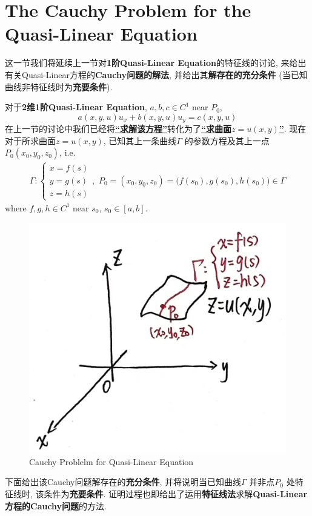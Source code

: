 \newpage

\section{The Cauchy Problem for the Quasi-Linear Equation}
	这一节我们将延续上一节对\textbf{1阶Quasi-Linear Equation}的特征线的讨论, 来给出有关Quasi-Linear方程的\textbf{Cauchy问题的解法}, 并给出其\textbf{解存在的充分条件} (当已知曲线非特征线时为\textbf{充要条件}). 
	
	\vspace*{4em}
	
	\hspace*{-1.85em}对于\textbf{2维1阶Quasi-Linear Equation}, $a , b , c \in C^1$ near $P_0$, 
	\[ a(x , y , u) u_x + b(x , y , u) u_y = c(x , y , u) \]
	在上一节的讨论中我们已经将\textbf{\underline{“求解该方程”}}转化为了\textbf{\underline{“求曲面$z = u(x , y)$”}}. 现在对于所求曲面$z = u(x , y)$, 已知其上一条曲线$\Gamma$ 的参数方程及其上一点$P_0(x_0 , y_0 , z_0)$, i.e.
	\begin{align*}
		\Gamma : 
		\begin{cases}
			x = f(s) \\
			y = g(s) \\
			z = h(s)
		\end{cases} , \,\, P_0 = (x_0 , y_0 , z_0) = \Big( f(s_0) , g(s_0) , h(s_0) \Big) \in \Gamma
	\end{align*}
	where $f , g , h \in C^{1}$ near $s_0$, $s_0 \in [a , b]$. 
	
	\vspace*{2em}
	
	\begin{figure}[thbp!]
		\centering
		\includegraphics[width=0.4\linewidth]{figure/1.3-1}
		\caption{Cauchy Problelm for Quasi-Linear Equation}
		\label{pic : 1.3-1} %
	\end{figure}
	
	\vspace*{2em}
	
	下面给出该Cauchy问题解存在的\textbf{充分条件}, 并将说明当已知曲线$\Gamma$ 并非点$P_0$ 处特征线时, 该条件为\textbf{充要条件}. 证明过程也即给出了运用\textbf{特征线法}求解\textbf{Quasi-Linear方程的Cauchy问题}的方法. 
	
